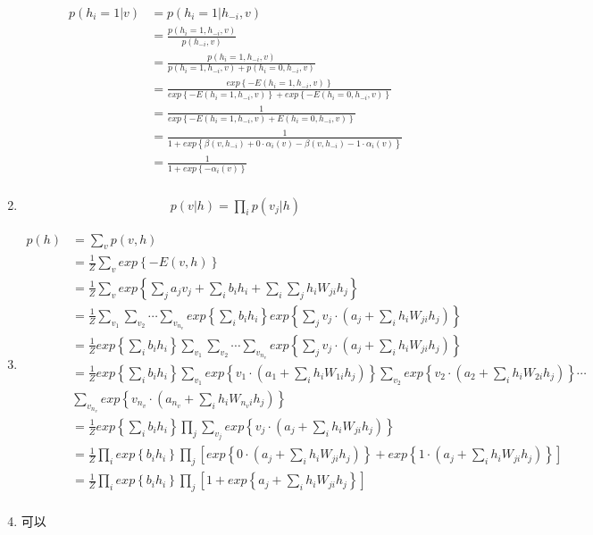 \documentclass[lang=cn,12pt]{elegantpaper}
\begin{document}
\begin{enumerate}
	
	\begin{align*}
		p(h_i=1|v) & = p(h_i=1|h_{-i},v)  \\
		& = \frac{p(h_i=1,h_{-i},v)}{p(h_{-i},v)}  \\
		& = \frac{p(h_i=1,h_{-i},v)}{p(h_i=1,h_{-i},v) + p(h_i=0,h_{-i},v)}  \\
		& = \frac{exp\left\{ -E(h_i=1,h_{-i},v)\right\}}{exp\left\{ -E(h_i=1,h_{-i},v)\right\} + exp\left\{ -E(h_i=0,h_{-i},v)\right\}}  \\
		& = \frac{1}{exp\left\{ -E(h_i=1,h_{-i},v)  + E(h_i=0,h_{-i},v)\right\}}  \\
		& = \frac{1}{ 1+ exp\left\{ \beta(v,h_{-i}) + 0\cdot \alpha_i(v) - \beta(v,h_{-i}) - 1\cdot \alpha_i(v) \right\}}  \\
		& = \frac{1}{ 1+ exp\left\{ -\alpha_i(v) \right\}}  \\
	\end{align*}

	\item \begin{align*}
	p(v|h) = \prod_ip(v_j|h)
	\end{align*}

	\item \begin{align*}
		p(h) & = \sum_vp(v,h) \\
		& = \frac{1}{Z}\sum_v exp \left\{-E(v,h) \right\} \\
		& = \frac{1}{Z}\sum_v exp \left\{ \sum_ja_jv_j + \sum_i b_ih_i + \sum_i \sum_jh_iW_{ji}h_j  \right\} \\
		& = \frac{1}{Z}\sum_{v_1}\sum_{v_2}\cdots\sum_{v_{n_v}} exp \left\{ \sum_i b_ih_i \right\} exp \left\{ \sum_jv_j \cdot\left(a_j + \sum_ih_iW_{ji}h_j\right) \right\} \\
		& = \frac{1}{Z} exp \left\{ \sum_i b_ih_i \right\} \sum_{v_1}\sum_{v_2}\cdots\sum_{v_{n_v}}  exp \left\{ \sum_jv_j \cdot\left(a_j + \sum_ih_iW_{ji}h_j\right) \right\} \\
		& = \frac{1}{Z} exp \left\{ \sum_i b_ih_i \right\} \sum_{v_1}exp \left\{ v_1 \cdot \left(a_1 + \sum_ih_iW_{1i}h_j \right) \right\} \sum_{v_2}exp \left\{ v_2 \cdot \left(a_2 + \sum_ih_iW_{2i}h_j \right) \right\} \cdots \\ 
		& \sum_{v_{n_v}}exp \left\{ v_{n_v} \cdot \left(a_{n_v} + \sum_ih_iW_{n_vi}h_j \right) \right\}\\
		& = \frac{1}{Z} exp \left\{ \sum_i b_ih_i \right\} \prod_j\sum_{v_j}exp \left\{ v_j \cdot \left(a_j + \sum_ih_iW_{ji}h_j \right) \right\} \\ 
		& = \frac{1}{Z} \prod_i exp \left\{ b_ih_i \right\} \prod_j \left[ exp \left\{ 0 \cdot \left(a_j + \sum_ih_iW_{ji}h_j \right) \right\} + exp \left\{ 1 \cdot \left(a_j + \sum_ih_iW_{ji}h_j \right) \right\} \right]\\ 
		& = \frac{1}{Z} \prod_i exp \left\{ b_ih_i \right\} \prod_j \left[ 1 + exp \left\{ a_j + \sum_ih_iW_{ji}h_j  \right\} \right]\\ 
		\end{align*}

		\item 可以
\end{enumerate}
\end{document}
